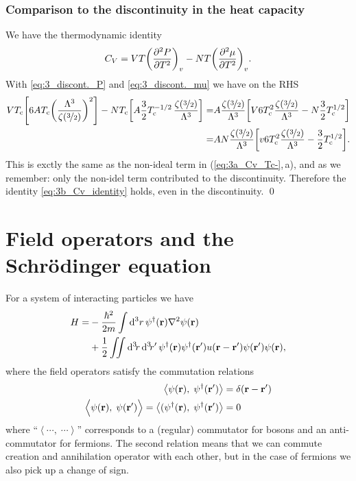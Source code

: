 \documentclass[11pt,letter, swedish, english
]{article}
\begin{document}
\subsubsection{Comparison to the discontinuity in the heat capacity}
We have the thermodynamic identity
\begin{equation}\label{eq:3b_Cv_identity}
C_V=VT\qty(\pdv[2]{P}{T})_v-NT\qty(\pdv[2]{\mu}{T})_v.
\end{equation}
With \eqref{eq:3_discont._P} and \eqref{eq:3_discont._mu} we have on
the RHS
\begin{equation}
\begin{aligned}
VT_{\text{c}}\qty[6AT_{\text{c}}\qty(\frac{\Lambda^3}{\zeta(\nicefrac{3}{2})})^2]
-NT_{\text{c}}\qty[A\frac{3}{2}
T_{\text{c}}^{-1/2}\,\frac{\zeta(\nicefrac{3}{2})}{\Lambda^3}]
=&A\frac{\zeta(\nicefrac{3}{2})}{\Lambda^3}
\qty[V6T_{\text{c}}^2\frac{\zeta(\nicefrac{3}{2})}{\Lambda^3}
-N\frac{3}{2}T_{\text{c}}^{1/2}]\\
=&AN\frac{\zeta(\nicefrac{3}{2})}{\Lambda^3}
\qty[v6T_{\text{c}}^2\frac{\zeta(\nicefrac{3}{2})}{\Lambda^3}
-\frac{3}{2}T_{\text{c}}^{1/2}].
\end{aligned}
\end{equation}
This is exctly the same as the non-ideal term in
(\ref{eq:3a_Cv_Tc-},\,a), and as we remember: only the non-idel term
contributed to the discontinuity. Therefore the identity
\eqref{eq:3b_Cv_identity} holds, even in the discontinuity.
\qed



\section{Field operators and the Schrödinger equation}
\newcommand{\scomm}[2]{\left\langle#1,\;#2\right\rangle}
\newcommand{\Scomm}[2]{\langle#1,\;#2\rangle}
\newcommand{\commute}[1]{\overbrace{#1}^{\text{commute}}}
For a system of interacting particles we have
\begin{equation}\label{eq:4_want_this}
\begin{aligned}
H=&-\frac{\hbar^2}{2m}\int\rd^3r\,
\psi^\dagger(\vb{r})\laplacian\psi(\vb{r})\\
&+\frac{1}{2}\iint\rd^3\!r\,\rd^3\!r'\,
\psi^\dagger(\vb{r})\psi^\dagger(\vb{r}')
u(\vb{r}-\vb{r}')\psi(\vb{r}')\psi(\vb{r}),
\end{aligned}
\end{equation}
where the field operators satisfy the commutation relations
\begin{equation}\label{eq:4_comm}
\begin{aligned}
\scomm{\psi(\vb{r})}{\psi^\dagger(\vb{r}')}
&=\delta(\vb{r}-\vb{r}')\\
\scomm{\psi(\vb{r})}{\psi(\vb{r}')\Big.}=
\scomm{(\psi^\dagger(\vb{r})}{\psi^\dagger(\vb{r}')}&=0
\end{aligned}
\end{equation}
where ``$\scomm{\cdots}{\cdots}$'' corresponds to a (regular)
commutator for bosons and an anti-commutator for fermions. The second
relation means that we can commute creation and annihilation operator
with each other, but in the case of fermions we also pick up a change
of sign. 
\end{document}
